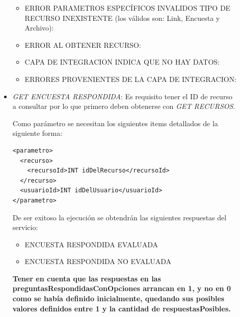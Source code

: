 \documentclass{article}
\begin{document}
\begin{description}
\begin{itemize}
\begin{itemize}
				\item ERROR PARAMETROS ESPEC\'IFICOS INVALIDOS TIPO DE RECURSO INEXISTENTE (los v\'alidos son: Link, Encuesta y Archivo):
				
								
				
				\item ERROR AL OBTENER RECURSO:
				
				
				
				\item CAPA DE INTEGRACION INDICA QUE NO HAY DATOS:
				
				
				
				\item ERRORES PROVENIENTES DE LA CAPA DE INTEGRACION:
				
				
				
			\end{itemize}
			
\item \emph{GET ENCUESTA RESPONDIDA}:  Es requisito tener el ID de recurso a consultar por lo que primero deben obtenerse con \emph{GET RECURSOS}.
			
Como par\'ametro se necesitan los siguientes items detallados de la siguiente forma:
				
\begin{lstlisting}
<parametro>
  <recurso>
    <recursoId>INT idDelRecurso</recursoId>
  </recurso>
  <usuarioId>INT idDelUsuario</usuarioId>
</parametro>
\end{lstlisting}	

\clearpage

De ser exitoso la ejecuci\'on se obtendr\'an las siguientes respuestas del servicio:		

		\begin{itemize}
			\item ENCUESTA RESPONDIDA EVALUADA
			
			
			
			\item ENCUESTA RESPONDIDA NO EVALUADA
			
			
		\end{itemize}
		
		\textbf{Tener en cuenta que las respuestas en las preguntasRespondidasConOpciones arrancan en 1, y no en 0 como se hab\'ia definido inicialmente, quedando sus posibles valores definidos entre 1 y la cantidad de respuestasPosibles.  } \newline			
	

\end{itemize}
\end{description}
\end{document}

